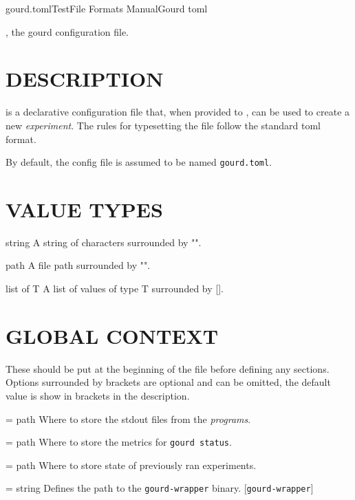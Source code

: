 \documentclass[a4paper,english]{article}
\begin{document}
	\pagestyle{fancy}


  \begin{Name}{5}{gourd.toml}{Test}{File Formats Manual}{Gourd toml}

      , the gourd configuration file.

  \end{Name}

  \section{DESCRIPTION}

      \noindent {} is a declarative configuration file that, when provided to , can be used to create a new \emph{experiment}.
      The rules for typesetting the file follow the standard toml format.

      \begin{Description}[Files]\setlength{\itemsep}{0cm}
          \item[\File{gourd.toml}] By default, the config file is assumed to be named \texttt{gourd.toml}.
      \end{Description}

  \section{VALUE TYPES}

    \begin{Description}[Types]\setlength{\itemsep}{0cm}
        \item[string] A string of characters surrounded by "".
        \item[path] A file path surrounded by "".
        \item[list of T] A list of values of type T surrounded by [].
    \end{Description}

  \section{GLOBAL CONTEXT}

    These should be put at the beginning of the file before defining any sections.
    Options surrounded by brackets are optional and can be omitted, the default value is show in brackets in the description.

    \begin{Description}[Options]\setlength{\itemsep}{0cm}
        \item[\Opt{output\_path} = path] Where to store the stdout files from the \emph{programs}.
        \item[\Opt{metrics\_path} = path] Where to store the metrics for \texttt{gourd status}.
        \item[\Opt{experiments\_folder} = path] Where to store state of previously ran experiments.
        \item[\oOpt{wrapper} = string] Defines the path to the \texttt{gourd-wrapper} binary. [\texttt{gourd-wrapper}]
    \end{Description}
\end{document}
